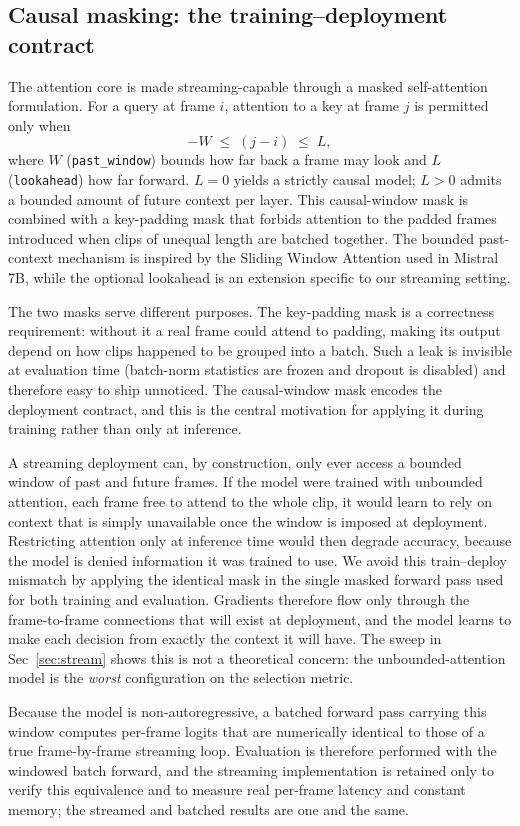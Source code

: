 \documentclass{article}
\begin{document}
\subsection{Causal masking: the training--deployment contract}

The attention core is made streaming-capable through a masked self-attention formulation.
For a query at frame $i$, attention to a key at frame $j$ is permitted only when
\[
    -W \;\le\; (j - i) \;\le\; L,
\]
where $W$ (\texttt{past\_window}) bounds how far back a frame may look and $L$
(\texttt{lookahead}) how far forward. $L=0$ yields a strictly causal model; $L>0$ admits a
bounded amount of future context per layer. This causal-window mask is combined with a
key-padding mask that forbids attention to the padded frames introduced when clips of
unequal length are batched together. The bounded past-context mechanism is inspired by the Sliding Window Attention used in Mistral 7B, while the optional lookahead is an extension specific to our streaming setting.

The two masks serve different purposes. The key-padding mask is a correctness requirement:
without it a real frame could attend to padding, making its output depend on how clips
happened to be grouped into a batch. Such a leak is invisible at evaluation time
(batch-norm statistics are frozen and dropout is disabled) and therefore easy to ship
unnoticed. The causal-window mask encodes the deployment contract, and this is the central
motivation for applying it during training rather than only at inference.

A streaming deployment can, by construction, only ever access a bounded window of past and
future frames. If the model were trained with unbounded attention, each frame free to attend to the whole clip, it would learn to rely on context that is simply unavailable
once the window is imposed at deployment. Restricting attention only at inference time
would then degrade accuracy, because the model is denied information it was trained to
use. We avoid this train--deploy mismatch by applying the identical mask in the single
masked forward pass used for both training and evaluation. Gradients therefore flow only
through the frame-to-frame connections that will exist at deployment, and the model learns
to make each decision from exactly the context it will have. The sweep in
Sec~\ref{sec:stream} shows this is not a theoretical concern: the unbounded-attention model
is the \emph{worst} configuration on the selection metric. 

Because the model is non-autoregressive, a batched forward pass carrying this window computes per-frame logits that are numerically identical to those of a true frame-by-frame streaming loop. Evaluation is therefore performed with the windowed batch forward, and the streaming implementation is retained only to verify this equivalence and to measure real per-frame latency and constant memory; the streamed and batched results are one and the same.
\end{document}
